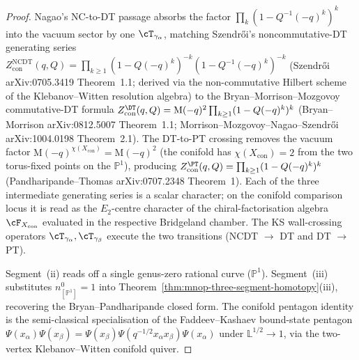 \begin{proof}
Nagao's NC-to-DT passage absorbs the factor
$\prod_{k}(1 - Q^{-1}(-q)^{k})^{k}$ into the vacuum sector by one
$\cT_{\gamma_\alpha}$, matching Szendr\H{o}i's noncommutative-DT
generating series
$Z^{\mathrm{NCDT}}_{\mathrm{con}}(q, Q) = \prod_{k \geq 1}(1 -
Q(-q)^k)^{-k} (1 - Q^{-1}(-q)^k)^{-k}$
(Szendr\H{o}i \textup{arXiv:0705.3419} Theorem~1.1; derived via the
non-commutative Hilbert scheme of the Klebanov--Witten resolution
algebra) to the Bryan--Morrison--Mozgovoy commutative-DT formula
$Z^{\DT}_{\mathrm{con}}(q, Q) = \mathrm{M}(-q)^2 \prod_{k \geq 1}(1 -
Q(-q)^k)^k$
(Bryan--Morrison \textup{arXiv:0812.5007} Theorem~1.1;
Morrison--Mozgovoy--Nagao--Szendr\H{o}i \textup{arXiv:1004.0198}
Theorem~2.1). The DT-to-PT crossing removes the vacuum factor
$\mathrm{M}(-q)^{\chi(X_{\mathrm{con}})} = \mathrm{M}(-q)^2$ (the
conifold has $\chi(X_{\mathrm{con}}) = 2$ from the two torus-fixed
points on the $\mathbb{P}^1$), producing
$Z^{\PT}_{\mathrm{con}}(q, Q) = \prod_{k \geq 1}(1 - Q(-q)^k)^k$
(Pandharipande--Thomas \textup{arXiv:0707.2348} Theorem~1). Each of
the three intermediate generating series is a scalar character; on the
conifold comparison locus it is read as the $E_2$-centre character of
the chiral-factorisation algebra $\cF_{X_{\mathrm{con}}}$ evaluated in
the respective Bridgeland chamber. The KS wall-crossing operators
$\cT_{\gamma_\alpha}, \cT_{\gamma_\beta}$ execute the two transitions
(NCDT $\to$ DT and DT $\to$ PT).

Segment~(ii) reads off a single genus-zero rational curve
($\mathbb{P}^1$). Segment~(iii) substitutes $n^0_{[\mathbb{P}^1]} = 1$
into Theorem~\ref{thm:mnop-three-segment-homotopy}(iii), recovering
the Bryan--Pandharipande closed form. The conifold pentagon identity
is the semi-classical specialisation of the Faddeev--Kashaev
bound-state pentagon
$\Psi(x_\alpha)\Psi(x_\beta) = \Psi(x_\beta)
\Psi(q^{-1/2} x_\alpha x_\beta) \Psi(x_\alpha)$ under
$\mathbb{L}^{1/2} \to 1$, via the two-vertex Klebanov--Witten
conifold quiver.
\end{proof}

